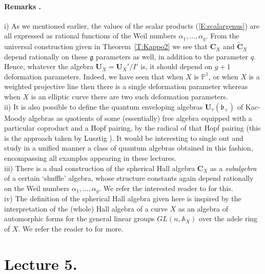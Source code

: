 \documentclass[a4paper,10pt]{amsart}
\def\U{\mathbf{U}}
\def\a{\alpha}
\def\CC{\mathbf{C}}
\def\g{\mathfrak{g}}
\def\bo{\mathfrak{b}}
\numberwithin{equation}{section}
\begin{document}
{\paragraph{\textbf{Remarks \thetheo.}} i) As we mentioned earlier, the values of the scalar products
(\ref{E:scalargenus}) are all expressed as rational functions of the Weil numbers $\a_1, \ldots, \a_g$.
From the universal construction given in Theorem~\ref{T:Kappo2} we see that $\CC_X$ and $\widetilde{\CC}_X$ depend rationally on these $\g$ parameters as well, in addition to the parameter $q$. Hence, whatever the algebra ${\U}_X={\U}_X'/I'$ is, it should depend on $g+1$ deformation parameters. Indeed, we have seen that when $X$ is $\mathbb{P}^1$, or when $X$ is a weighted projective line then there is a single deformation parameter whereas when $X$ is an elliptic curve there are two such deformation parameters.\\
ii) It is also possible to define the quantum enveloping algebras $\U_v(\bo_+)$ of Kac-Moody algebras as quotients of some (essentially) free algebra equipped with a particular coproduct and a Hopf pairing, by the radical of that Hopf pairing (this is the approach taken by Lusztig \cite{Lu1}). It would be interesting to single out and study in a unified manner a class of quantum algebras obtained in this fashion, encompassing all examples appearing in these lectures.\\
iii) There is a dual construction of the spherical Hall algebra $\CC_X$ as a \textit{subalgebra} of a certain `shuffle' algebra, whose structure constants again depend rationally on the Weil numbers $\a_1, \ldots, \a_g$. We refer the interested reader to \cite{SV3} for this.\\
iv) The definition of the spherical Hall algebra given here is inspired by the interpretation of the (whole) Hall algebra of a curve $X$ as an algebra of automorphic forms for the general linear groups $GL(n, \mathbb{A}_X)$ over the adele ring of $X$. We refer the reader to \cite[Lecture~5]{SLectures2} for more.

\newpage

\section{Lecture 5.}

\setcounter{section}{5}
\setcounter{equation}{0}
\setcounter{theo}{0}

}
\end{document}
